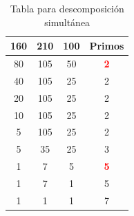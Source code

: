 \begin{enumerate}
\begin{table}[ht]
    \centering
    \caption{Tabla para descomposición simultánea}
    \label{tab:mcmmcd}
    \renewcommand{\arraystretch}{1.2} %
    \begin{tabular}{|c|c|c|c|}
        \hline
        \textbf{160} & \textbf{210} & \textbf{100} & \textbf{Primos} \\ \hline
        80 & 105 & 50 & \textcolor{red}{\textbf{2}} \\ \hline
        40 & 105 & 25 & 2 \\ \hline
        20 & 105 & 25 & 2 \\ \hline
        10 & 105 & 25 & 2 \\ \hline
        5 & 105 & 25 & 2 \\ \hline
        5 & 35 & 25 & 3 \\ \hline
        1 & 7 & 5 & \textcolor{red}{\textbf{5}} \\ \hline
        1 & 7 & 1 & 5 \\ \hline
        1 & 1 & 1 & 7 \\ \hline
    \end{tabular}
\end{table}
\end{enumerate}
